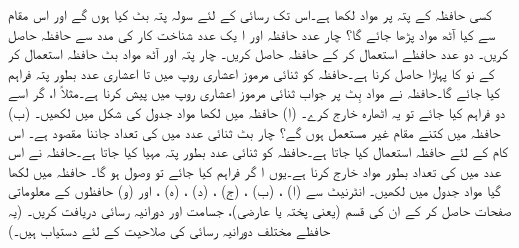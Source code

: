  کسی حافظہ کے   پتہ پر  مواد لکھا ہے۔اس تک رسائی کے لئے سولہ پتہ بٹ کیا ہوں گے اور اس  مقام سے کیا  آٹھ مواد  پڑھا جائے گا؟
 چار عدد  حافظہ  اور ا یک عدد  شناخت کار کی مدد سے  حافظہ حاصل کریں۔
 دو عدد  حافظے  استعمال  کر کے  حافظہ حاصل کریں۔
 چار پتہ  اور آٹھ مواد بٹ حافظہ استعمال کر کے  نو کا  پہاڑا حاصل کرنا ہے۔حافظہ کو  ثنائی مرموز اعشاری  روپ میں  تا  اعشاری عدد بطور پتہ فراہم کیا جائے گا۔حافظہ نے مواد  بِٹ پر جواب ثنائی  مرموز اعشاری  روپ میں پیش کرنا ہے۔مثلاً ا، گر اسے دو  فراہم کیا جائے تو یہ اٹھارہ   خارج کرے۔ (ا) حافظہ میں لکھا مواد جدول کی شکل میں لکھیں۔ (ب) حافظہ میں کتنے مقام غیر مستعمل ہوں گے؟ 
 چار بٹ ثنائی عدد  میں   کی تعداد جاننا مقصود ہے۔ اس کام کے لئے  حافظہ استعمال کیا جاتا ہے۔حافظہ کو ثنائی عدد بطور پتہ مہیا کیا جاتا ہے۔حافظہ نے  اس عدد میں   کی تعداد بطور مواد خارج کرنا ہے۔یوں ا گر    فراہم کیا جائے تو    وصول ہو گا۔ حافظہ میں لکھا گیا مواد جدول میں لکھیں۔
 انٹرنیٹ سے   (ا) ، (ب) ،  (ج) ،  (د)  ، (ہ)  ، اور  (و)    حافظوں  کے  معلوماتی صفحات  حاصل کر کے ان کی قسم (یعنی پختہ یا عارضی)، جسامت اور دورانیہ رسائی دریافت کریں۔ (یہ حافظے مختلف دورانیہ رسائی کی صلاحیت کے لئے دستیاب ہیں۔)
